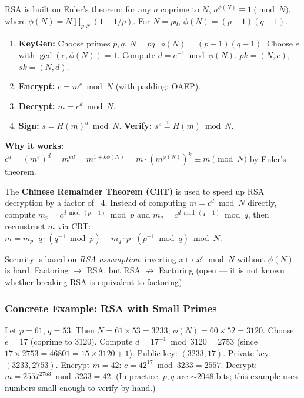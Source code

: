 RSA is built on Euler's theorem: for any $a$ coprime to $N$, $a^{\phi(N)} \equiv 1 \pmod N$, where $\phi(N) = N \prod_{p|N} (1 - 1/p)$. For $N = pq$, $\phi(N) = (p-1)(q-1)$.

\begin{enumerate}
\item \textbf{KeyGen:} Choose primes $p,q$. $N = pq$. $\phi(N) = (p-1)(q-1)$. Choose $e$ with $\gcd(e,\phi(N))=1$. Compute $d = e^{-1} \bmod \phi(N)$. $pk = (N,e)$, $sk = (N,d)$.
\item \textbf{Encrypt:} $c = m^e \bmod N$ (with padding: OAEP).
\item \textbf{Decrypt:} $m = c^d \bmod N$.
\item \textbf{Sign:} $s = H(m)^d \bmod N$. \textbf{Verify:} $s^e \stackrel{?}{=} H(m) \bmod N$.
\end{enumerate}

\textbf{Why it works:} $c^d = (m^e)^d = m^{ed} = m^{1 + k\phi(N)} = m \cdot (m^{\phi(N)})^k \equiv m \pmod N$ by Euler's theorem.

The \textbf{Chinese Remainder Theorem (CRT)} is used to speed up RSA decryption by a factor of ~4. Instead of computing $m = c^d \bmod N$ directly, compute $m_p = c^{d \bmod (p-1)} \bmod p$ and $m_q = c^{d \bmod (q-1)} \bmod q$, then reconstruct $m$ via CRT: $m = m_p \cdot q \cdot (q^{-1} \bmod p) + m_q \cdot p \cdot (p^{-1} \bmod q) \bmod N$.

Security is based on \emph{RSA assumption}: inverting $x \mapsto x^e \bmod N$ without $\phi(N)$ is hard. Factoring $\to$ RSA, but RSA $\not\to$ Facturing (open — it is not known whether breaking RSA is equivalent to factoring).

\subsubsection*{Concrete Example: RSA with Small Primes}
Let $p = 61$, $q = 53$. Then $N = 61 \times 53 = 3233$, $\phi(N) = 60 \times 52 = 3120$. Choose $e = 17$ (coprime to 3120). Compute $d = 17^{-1} \bmod 3120 = 2753$ (since $17 \times 2753 = 46801 = 15 \times 3120 + 1$). Public key: $(3233, 17)$. Private key: $(3233, 2753)$. Encrypt $m = 42$: $c = 42^{17} \bmod 3233 = 2557$. Decrypt: $m = 2557^{2753} \bmod 3233 = 42$. (In practice, $p,q$ are $\sim 2048$ bits; this example uses numbers small enough to verify by hand.)

